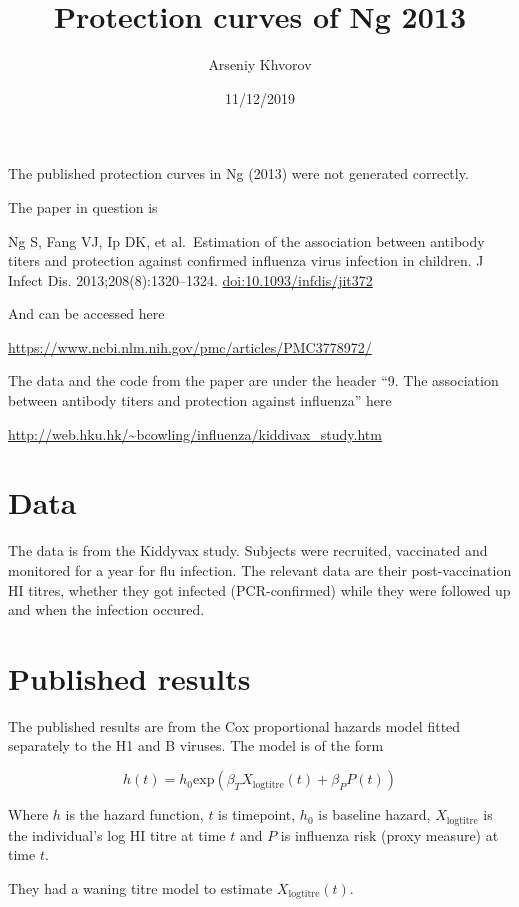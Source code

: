 \documentclass[]{article}
\title{Protection curves of Ng 2013}
\author{Arseniy Khvorov}
\date{11/12/2019}
\begin{document}
\maketitle

The published protection curves in Ng (2013) were not generated correctly.

The paper in question is

Ng S, Fang VJ, Ip DK, et al.~Estimation of the association between antibody titers and protection against confirmed influenza virus infection in children. J Infect Dis. 2013;208(8):1320--1324. \url{doi:10.1093/infdis/jit372}

And can be accessed here

\url{https://www.ncbi.nlm.nih.gov/pmc/articles/PMC3778972/}

The data and the code from the paper are under the header ``9. The association between antibody titers and protection against influenza'' here

\url{http://web.hku.hk/~bcowling/influenza/kiddivax_study.htm}

\hypertarget{data}{%
\section{Data}\label{data}}

The data is from the Kiddyvax study. Subjects were recruited, vaccinated and monitored for a year for flu infection. The relevant data are their post-vaccination HI titres, whether they got infected (PCR-confirmed) while they were followed up and when the infection occured.

\hypertarget{published-results}{%
\section{Published results}\label{published-results}}

The published results are from the Cox proportional hazards model fitted separately to the H1 and B viruses. The model is of the form

\[
h(t)=h_0\text{exp}(\beta_TX_\text{logtitre}(t)+\beta_PP(t))
\]

Where \(h\) is the hazard function, \(t\) is timepoint, \(h_0\) is baseline hazard, \(X_\text{logtitre}\) is the individual's log HI titre at time \(t\) and \(P\) is influenza risk (proxy measure) at time \(t\).

They had a waning titre model to estimate \(X_\text{logtitre}(t)\).
\end{document}
